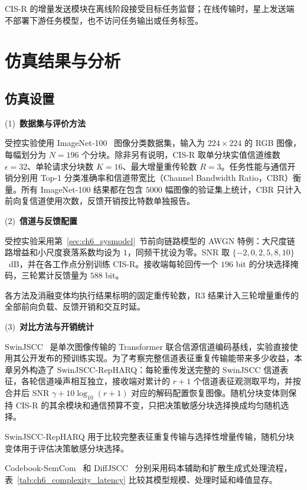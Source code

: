 CIS-R 的增量发送模块在离线阶段接受目标任务监督；在线传输时，星上发送端不部署下游任务模型，也不访问任务输出或任务标签。

\section{仿真结果与分析}
\label{sec:ch6_sim}

\subsection{仿真设置}
\label{subsec:ch6_setup}

\noindent(1)~\textbf{数据集与评价方法}

受控实验使用 ImageNet-100~\cite{deng-ImageNet-CVPR09} 图像分类数据集，输入为 $224\times224$ 的 RGB 图像，每幅划分为 $N=196$ 个分块。除非另有说明，CIS-R 取单分块实值信道维数 $\epsilon=32$、单轮请求分块数 $K=16$、最大增量重传轮数 $R=3$。任务性能与通信开销分别用 Top-1 分类准确率和信道带宽比（Channel Bandwidth Ratio，CBR）衡量。所有 ImageNet-100 结果都在包含 $5000$ 幅图像的验证集上统计，CBR 只计入前向复信道使用次数，反馈开销按比特数单独报告。

\noindent(2)~\textbf{信道与反馈配置}

受控实验采用第~\ref{sec:ch6_sysmodel}~节前向链路模型的 AWGN 特例：大尺度链路增益和小尺度衰落系数均设为 $1$，同频干扰设为零。SNR 取 $\{-2,0,2,5,8,10\}$~dB，并在各工作点分别训练 CIS-R。接收端每轮回传一个 $196$ bit 的分块选择掩码，三轮累计反馈量为 $588$ bit。

各方法及消融变体均执行结果标明的固定重传轮数，R3 结果计入三轮增量重传的全部前向负载、反馈开销和交互时延。

\noindent(3)~\textbf{对比方法与开销统计}

SwinJSCC~\cite{SwinJSCC} 是单次图像传输的 Transformer 联合信源信道编码基线，实验直接使用其公开发布的预训练实现。为了考察完整信道表征重复传输能带来多少收益，本章另外构造了 SwinJSCC-RepHARQ：每轮重传发送完整的 SwinJSCC 信道表征，各轮信道噪声相互独立，接收端对累计的 $r+1$ 个信道表征观测取平均，并按合并后 SNR $\gamma+10\log_{10}(r+1)$ 对应的解码配置恢复图像。随机分块变体则保持 CIS-R 的其余模块和通信预算不变，只把决策敏感分块选择换成均匀随机选择。

SwinJSCC-RepHARQ 用于比较完整表征重复传输与选择性增量传输，随机分块变体用于评估决策敏感分块选择。

Codebook-SemCom~\cite{zhang-CodebookSemanticCoding-TCOM2025} 和 DiffJSCC~\cite{DiffJSCC} 分别采用码本辅助和扩散生成式处理流程，表~\ref{tab:ch6_complexity_latency} 比较其模型规模、处理时延和峰值显存。

